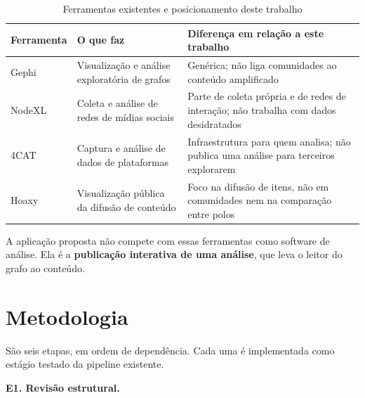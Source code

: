 \documentclass[12pt,a4paper,oneside]{article}
\begin{document}
\begin{table}[H]
\centering
\singlespacing\small
\caption{Ferramentas existentes e posicionamento deste trabalho}\label{tab:ferramentas}
\begin{tabularx}{\textwidth}{>{\raggedright\arraybackslash}p{2.4cm} X X}
\toprule
\textbf{Ferramenta} & \textbf{O que faz} & \textbf{Diferença em relação a este trabalho} \\
\midrule
Gephi\footnotemark & Visualização e análise exploratória de grafos & Genérica; não liga comunidades ao conteúdo amplificado \\
NodeXL\footnotemark & Coleta e análise de redes de mídias sociais & Parte de coleta própria e de redes de interação; não trabalha com dados desidratados \\
4CAT\footnotemark & Captura e análise de dados de plataformas & Infraestrutura para quem analisa; não publica uma análise para terceiros explorarem \\
Hoaxy\footnotemark & Visualização pública da difusão de conteúdo & Foco na difusão de itens, não em comunidades nem na comparação entre polos \\
\bottomrule
\end{tabularx}
\end{table}
\addtocounter{footnote}{-4}

A aplicação proposta não compete com essas ferramentas como software de análise. Ela é a \textbf{publicação interativa de uma análise}, que leva o leitor do grafo ao conteúdo.


\section{Metodologia}

São seis etapas, em ordem de dependência. Cada uma é implementada como estágio testado da pipeline existente.

\textbf{E1. Revisão estrutural.}
\end{document}
